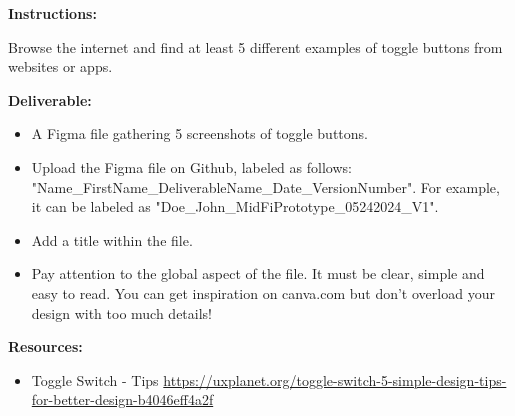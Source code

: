 \makeheaderfiles

\textbf{Instructions:}

Browse the internet and find at least 5 different examples of toggle buttons from websites or apps.

\textbf{Deliverable:}

\begin{itemize}
\item A Figma file gathering 5 screenshots of toggle buttons.
\item Upload the Figma file on Github, labeled as follows: "Name\_FirstName\_DeliverableName\_Date\_VersionNumber". For example, it can be labeled as "Doe\_John\_MidFiPrototype\_05242024\_V1".
\item Add a title within the file.
\item Pay attention to the global aspect of the file. It must be clear, simple and easy to read. You can get inspiration on canva.com but don't overload your design with too much details!
\end{itemize}

\textbf{Resources:}

\begin{itemize}
\item Toggle Switch - Tips \url{https://uxplanet.org/toggle-switch-5-simple-design-tips-for-better-design-b4046eff4a2f}
\end{itemize}

